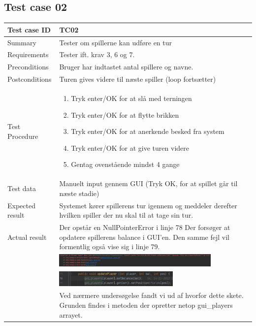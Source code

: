 \documentclass{article}
\begin{document}
\subsection{Test case 02}
\begin{tabular}{ | m{} | m{}|}
    \hline
    Test case ID & TC02  \\
    \hline
    Summary & Tester om spillerne kan udføre en tur\\
    \hline
    Requirements & Tester ift. krav 3, 6 og 7.\\
    \hline
    Preconditions & Bruger har indtastet antal spillere og navne.\\
    \hline
    Postconditions & Turen gives videre til næste spiller (loop fortsætter)\\
    \hline
    Test Procedure & \begin{enumerate}[itemsep=0.1mm]
        \item Tryk enter/OK for at slå med terningen
        \item Tryk enter/OK for at flytte brikken
        \item Tryk enter/OK for at anerkende besked fra system
        \item Tryk enter/OK for at give turen videre
        \item Gentag ovenstående mindst 4 gange
    \end{enumerate}\\
    \hline
    Test data & Manuelt input gennem GUI (Tryk OK, for at spillet går til næste stadie)\\
    \hline
    Expected result & Systemet kører spillerens tur igennem og meddeler derefter hvilken spiller der nu skal til at tage sin tur.\\
    \hline
    Actual result & Der opstår en NullPointerError i linje 78 Der forsøger at opdatere spillerens balance i GUI'en. Den samme fejl vil formentlig også vise sig i linje 79.\\
     & \includegraphics[width = 0.8\textwidth]{Billeder/TC02-1.jpg}\\
     & \includegraphics[width = 0.6\textwidth]{Billeder/TC02-2.jpg}\\
     & Ved nærmere undersøgelse fandt vi ud af hvorfor dette skete. Grunden findes i metoden der opretter netop gui\_players arrayet.\\

\end{tabular}
\end{document}
